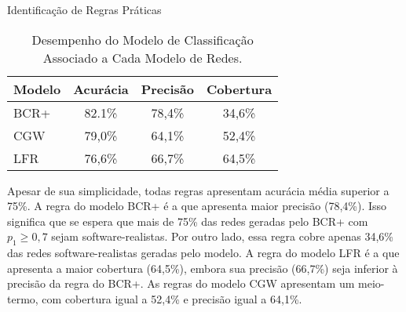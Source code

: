 \begin{section}{Identificação de Regras Práticas}
	\begin{table}
	\caption{Desempenho do Modelo de Classificação Associado a Cada Modelo de Redes.}
	\centering
	\begin{tabular}{|l|c|c|c|}
	\hline
	\textbf{Modelo} & \textbf{Acurácia} & \textbf{Precisão} & \textbf{Cobertura} \\
	\hline 
	\hline
	BCR+ &  82.1\%  &  78,4\%  &  34,6\% \\
	CGW  &  79,0\%  &  64,1\%  &  52,4\% \\
	LFR  &  76,6\%  &  66,7\%  &  64,5\% \\
	\hline
	\end{tabular}
	\label{tab:rules}
	\end{table}

	Apesar de sua simplicidade, todas regras apresentam acurácia média superior a 75\%. A regra do modelo BCR+ é a que apresenta maior precisão (78,4\%). Isso significa que se espera que mais de 75\% das redes geradas pelo BCR+ com $p_1 \ge 0,7$ sejam software-realistas. Por outro lado, essa regra cobre apenas 34,6\% das redes software-realistas geradas pelo modelo. A regra do modelo LFR é a que apresenta a maior cobertura (64,5\%), embora sua precisão (66,7\%) seja inferior à precisão da regra do BCR+. As regras do modelo CGW apresentam um meio-termo, com cobertura igual a 52,4\% e precisão igual a 64,1\%.
	




\end{section}

